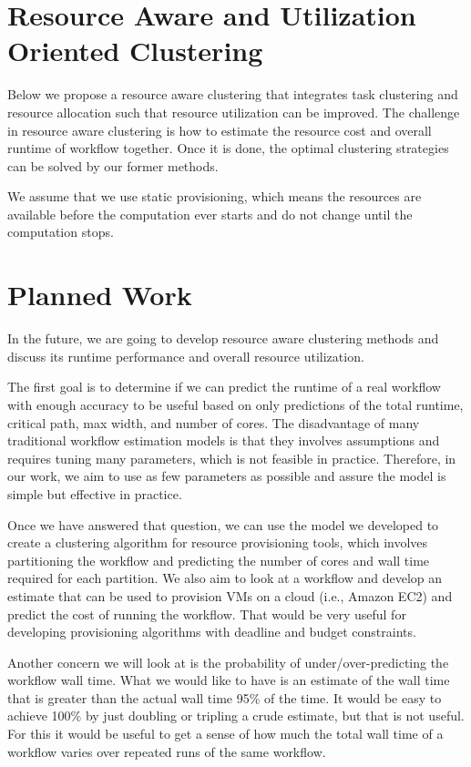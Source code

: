\section{Resource Aware and Utilization Oriented Clustering}

Below we propose a resource aware clustering that integrates task clustering and resource allocation such that resource utilization can be improved. The challenge in resource aware clustering is how to estimate the resource cost and overall runtime of workflow together. Once it is done, the optimal clustering strategies can be solved by our former methods. 

We assume that we use static provisioning, which means the resources are available before the computation ever starts and do not change until the computation stops. 


\section{Planned Work}
In the future, we are going to develop resource aware clustering methods and discuss its runtime performance and overall resource utilization. 

The first goal is to determine if we can predict the runtime of a real workflow with enough accuracy to be useful based on only predictions of the total runtime, critical path, max width, and number of cores. The disadvantage of many traditional workflow estimation models is that they involves assumptions and requires tuning many parameters, which is not feasible in practice. Therefore, in our work, we aim to use as few parameters as possible and assure the model is simple but effective in practice. 

Once we have answered that question, we can use the model we developed to create a clustering algorithm for resource provisioning tools, which involves partitioning the workflow and predicting the number of cores and wall time required for each partition. We also aim to look at a workflow and develop an estimate that can be used to provision VMs on a cloud (i.e., Amazon EC2) and predict the cost of running the workflow. That would be very useful for developing provisioning algorithms with deadline and budget constraints.

Another concern we will look at is the probability of under/over-predicting the workflow wall time. What we would like to have is an estimate of the wall time that is greater than the actual wall time 95\% of the time. It would be easy to achieve 100\% by just doubling or tripling a crude estimate, but that is not useful. For this it would be useful to get a sense of how much the total wall time of a workflow varies over repeated runs of the same workflow.

